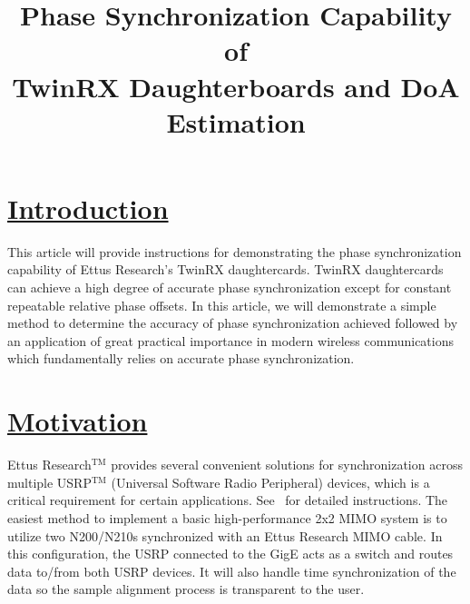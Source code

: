 \documentclass[a4paper, 11pt]{article}
\title{\vspace{-2cm}\huge Phase Synchronization Capability of \\TwinRX Daughterboards and DoA Estimation}
\begin{document}
\date{\vspace{-5ex}}
\maketitle
\date{\vspace{-5ex}}
\section*{\underline{Introduction}}
This article will provide instructions for demonstrating the phase synchronization capability of Ettus Research's TwinRX daughtercards. TwinRX daughtercards can achieve a high degree of accurate phase synchronization except for constant repeatable relative phase offsets. In this article, we will demonstrate a simple method to determine the accuracy of phase synchronization achieved followed by an application of great practical importance in modern wireless communications which fundamentally relies on accurate phase synchronization. 

\section*{\underline{Motivation}}
Ettus Research$^{\mathrm{TM}}$ provides several convenient solutions for synchronization across multiple USRP$^{\mathrm{TM}}$ (Universal Software Radio Peripheral) devices, which is a critical requirement for certain applications. See~\cite{pandeya} for detailed instructions. The easiest method to implement a basic high-performance 2x2 MIMO system is to utilize two N200/N210s synchronized with an Ettus Research MIMO cable. In this configuration, the USRP connected to the GigE acts as a switch and routes data to/from both USRP devices. It will also handle time synchronization of the data so the sample alignment process is transparent to the user.
\end{document}
